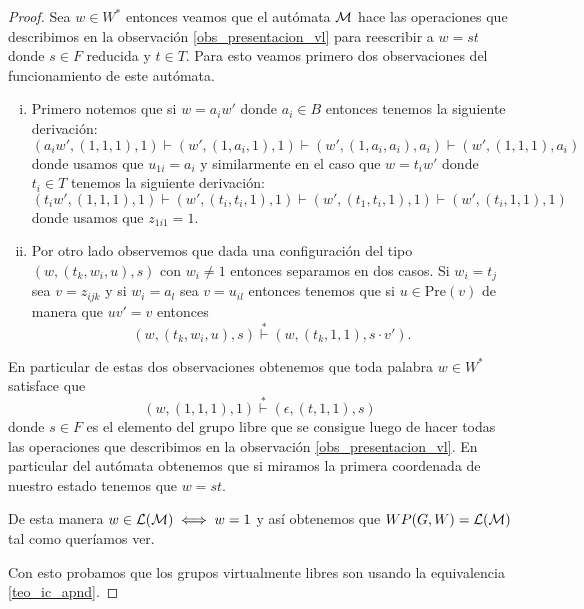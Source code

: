 \documentclass[tesis.tex]{subfiles}
\begin{document}
\begin{proof}
	Sea $w \in W^*$ entonces veamos que el autómata $\cal M$ hace las operaciones que describimos en la observación \ref{obs_presentacion_vl} para reescribir a $w = st$ donde $s \in F$ reducida y $t \in T$.
	Para esto veamos primero dos observaciones del funcionamiento de este autómata.
	
	\begin{enumerate}[i)]
		\item Primero notemos que si $w = a_{i}w'$ donde $a_{i} \in B$ entonces tenemos la siguiente derivación:
		\[
		(a_{i}w', ( 1,1,1), 1 ) \vdash (w', (1,a_{i},1),1) \vdash (w',(1,a_{i},a_{i}),a_{i}) \vdash (w', (1,1,1), a_{i})
		\]
		donde usamos que $u_{1i} = a_{i}$
		y similarmente en el caso que $w = t_{i}w'$ donde $t_{i} \in T$ tenemos la siguiente derivación:
		\[
		(t_{i}w', (1,1,1), 1) \vdash (w', (t_{i},t_{i},1),1) \vdash (w',(t_{1},t_{i},1),1) \vdash (w', (t_{i},1,1), 1)
		\]
		donde usamos que $z_{1i1} = 1$.
		
		\item Por otro lado observemos que dada una configuración del tipo $(w, ( t_{k}, w_{i}, u), s)$ con $w_{i} \neq 1$ entonces separamos en dos casos.
		Si $w_{i} = t_{j}$ sea $v = z_{ijk}$ y si $w_{i} = a_{l}$ sea $v = u_{il}$ entonces tenemos que si $u \in \text{Pre}(v)$ de manera que $uv' = v$ entonces
		\[
		(w, ( t_{k}, w_{i}, u), s) \overset{*}{\vdash} (w, ( t_{k}, 1, 1), s \cdot v').
		\]
	\end{enumerate}
	
	
	
	
	
	
	En particular de estas dos observaciones obtenemos que toda palabra $w \in W^*$ satisface que 
	\[
		(w, (1,1,1), 1) \overset{*}{\vdash} (\epsilon, (t, 1,1), s)
	\]
	donde $s \in F$ es el elemento del grupo libre que se consigue luego de hacer todas las operaciones que describimos en la observación \ref{obs_presentacion_vl}. 
	En particular del autómata obtenemos que si miramos la primera coordenada de nuestro estado tenemos que $w = st$.
	
	De esta manera $w \in {\cal L(M)} \iff w = 1 $ y así obtenemos que $WP(G,W) = \cal L(M)$ tal como queríamos ver.
	
	
	
	Con esto probamos que los grupos virtualmente libres son \ic usando la equivalencia \ref{teo_ic_apnd}.
	
\end{proof}

\begin{center}
\end{center}
\end{document}
